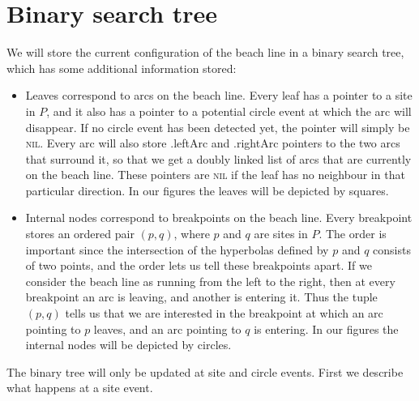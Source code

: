 \section{Binary search tree} \label{sec:bst}
We will store the current configuration of the beach line in a binary search tree, which has some additional information stored:
\begin{itemize}
    \item Leaves correspond to arcs on the beach line. Every leaf has a pointer to a site in $P$, and it also has a pointer to a potential circle event at which the arc will disappear. If no circle event has been detected yet, the pointer will simply be \textsc{nil}. Every arc will also store \textsf{.leftArc} and \textsf{.rightArc} pointers to the two arcs that surround it, so that we get a doubly linked list of arcs that are currently on the beach line. These pointers are \textsc{nil} if the leaf has no neighbour in that particular direction. In our figures the leaves will be depicted by squares.
    
    \item Internal nodes correspond to breakpoints on the beach line. Every breakpoint stores an ordered pair $(p, q)$, where $p$ and $q$ are sites in $P$. The order is important since the intersection of the hyperbolas defined by $p$ and $q$ consists of two points, and the order lets us tell these breakpoints apart. If we consider the beach line as running from the left to the right, then at every breakpoint an arc is leaving, and another is entering it. Thus the tuple $(p, q)$ tells us that we are interested in the breakpoint at which an arc pointing to $p$ leaves, and an arc pointing to $q$ is entering. In our figures the internal nodes will be depicted by circles.
\end{itemize}

The binary tree will only be updated at site and circle events. First we describe what happens at a site event.

